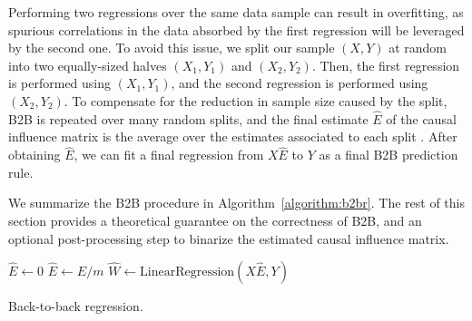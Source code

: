 \documentclass{article}
\begin{document}


Performing two regressions over the same data sample can result in overfitting, as spurious correlations in the data absorbed by the first regression will be leveraged by the second one.
%
To avoid this issue, we split our sample $(X, Y)$ at random into two equally-sized halves $(X_1, Y_1)$ and $(X_2, Y_2)$.
%
Then, the first regression is performed using $(X_1, Y_1)$, and the second regression is performed using $(X_2, Y_2)$.
%
To compensate for the reduction in sample size caused by the split, B2B is repeated over many random splits, and the final estimate $\hat E$ of the causal influence matrix is the average over the estimates associated to each split \citep{efron1992bootstrap}.
%
After obtaining $\hat{E}$, we can fit a final regression from $X \hat{E}$ to $Y$ as a final B2B prediction rule.

We summarize the B2B procedure in Algorithm~\ref{algorithm:b2br}.
%
The rest of this section provides a theoretical guarantee on the correctness of B2B, and an optional post-processing step to binarize the estimated causal influence matrix.



\begin{algorithm}[H]
    $\hat{E} \leftarrow 0$\;
    $\hat{E} \leftarrow \hat{E} / m$\;
    $\hat{W} \leftarrow \text{LinearRegression}(X \hat{E}, Y)$\;
    \caption{Back-to-back regression.}
    \label{algorithm:b2br}
\end{algorithm}
\end{document}
